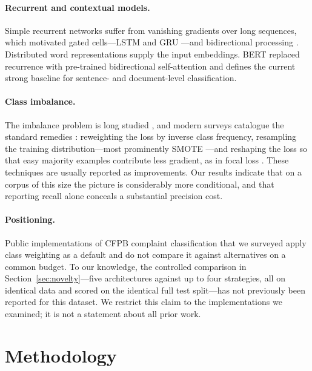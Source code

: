 \documentclass[11pt]{article}
\begin{document}
\paragraph{Recurrent and contextual models.}
Simple recurrent networks \cite{elman1990finding} suffer from vanishing
gradients over long sequences, which motivated gated cells---LSTM
\cite{hochreiter1997long} and GRU \cite{cho2014learning}---and bidirectional
processing \cite{schuster1997bidirectional}. Distributed word representations
\cite{mikolov2013efficient,pennington2014glove} supply the input embeddings.
BERT \cite{devlin2019bert} replaced recurrence with pre-trained bidirectional
self-attention and defines the current strong baseline for sentence- and
document-level classification.

\paragraph{Class imbalance.}
The imbalance problem is long studied \cite{japkowicz2002class}, and modern
surveys catalogue the standard remedies \cite{johnson2019survey}: reweighting
the loss by inverse class frequency, resampling the training distribution---most
prominently SMOTE \cite{chawla2002smote}---and reshaping the loss so that easy
majority examples contribute less gradient, as in focal loss
\cite{lin2017focal}. These techniques are usually reported as improvements. Our
results indicate that on a corpus of this size the picture is considerably more
conditional, and that reporting recall alone conceals a substantial precision
cost.

\paragraph{Positioning.}
Public implementations of CFPB complaint classification that we surveyed apply
class weighting as a default and do not compare it against alternatives on a
common budget. To our knowledge, the controlled comparison in
Section~\ref{sec:novelty}---five architectures against up to four
strategies, all on identical data and scored on the identical full test
split---has not previously been reported for this dataset. We restrict this
claim to the implementations we examined; it is not a statement about all prior
work.

\section{Methodology}
\label{sec:method}
\end{document}

